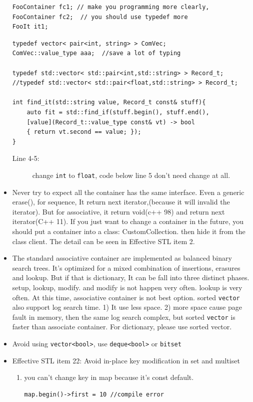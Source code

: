 \documentclass[a4paper,11pt,twoside]{book}
\begin{document}
\begin{itemize}
\begin{lstlisting}[numbers=none]
FooContainer fc1; // make you programming more clearly,
FooContainer fc2;  // you should use typedef more
FooIt it1;
\end{lstlisting}

\begin{lstlisting}
typedef vector< pair<int, string> > ComVec;
ComVec::value_type aaa;  //save a lot of typing 

typedef std::vector< std::pair<int,std::string> > Record_t;
//typedef std::vector< std::pair<float,std::string> > Record_t;

int find_it(std::string value, Record_t const& stuff){
	auto fit = std::find_if(stuff.begin(), stuff.end(),
	[value](Record_t::value_type const& vt) -> bool
	{ return vt.second == value; });
}	
\end{lstlisting}
\begin{description}
	\item[Line 4-5:] change \texttt{int} to \texttt{float}, code below line 5 don't need change at all.
\end{description}


\item Never try to expect all the container has the same interface. Even a generic erase(), for sequence, It return next iterator,(because it will invalid the iterator).   But for associative, it return void(c++ 98) and return next iterator(C++ 11). If you just want to change a container in the future, you should put a container into a class: CustomCollection. then hide it from the class client. The detail can be seen in Effective STL item 2.

\item The standard associative container are implemented as balanced binary search trees.  It's optimized for a mixed combination of insertions, erasures and lookup.  But if that is dictionary, It can be fall into three distinct phases. setup, lookup, modify. and modify is not happen very often. lookup is very often. At this time, associative container is not best option. sorted \texttt{vector} also support log search time.  1) It use less space. 2) more space cause page fault in memory, then the same log search complex, but sorted \texttt{vector} is faster than associate container. For dictionary, please use sorted vector.


\item Avoid using \texttt{vector<bool>}, use \texttt{deque<bool>} or \texttt{bitset}


\item Effective STL item 22: Avoid in-place key modification in set and multiset
\begin{enumerate}
   \item you can't change key in map because it's const default.
\begin{lstlisting}[numbers=none]
map.begin()->first = 10 //compile error
\end{lstlisting}


\end{enumerate}
\end{itemize}
\end{document}
